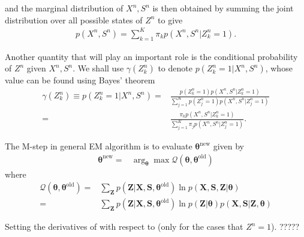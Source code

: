 \documentclass[11pt]{extarticle}
\newcommand{\0}{\mathbf{0}}
\renewcommand{\(}{\left(}
\renewcommand{\)}{\right)}
\theoremstyle{definition}
\begin{document}
and the marginal distribution of $X^{n}, S^{n}$ is then obtained by summing the joint distribution over all possible states of $Z^{n}$ to give
\begin{align*}
	p(X^{n}, S^{n}) = \sum_{k=1}^{K} \pi_{k} p(X^{n}, S^{n} \vert Z^{n}_{k}=1).
\end{align*}
\par Another quantity that will play an important role is the conditional probability of $Z^{n}$ given $X^{n}, S^{n}$. We shall use $\gamma(Z^{n}_{k})$ to denote $p(Z^{n}_{k} = 1 \vert X^{n}, S^{n})$, whose value can be found using Bayes' theorem
\begin{align*}
	\gamma(Z^{n}_{k}) \equiv p(Z^{n}_{k} = 1 \vert X^{n}, S^{n}) =& \frac{p(Z^{n}_{k}=1)p(X^{n}, S^{n} \vert Z^{n}_{k} = 1)}{\sum_{j=1}^{K}p(Z^{n}_{j}=1)p(X^{n}, S^{n} \vert Z^{n}_{j}=1)} \\
	=& \frac{\pi_{k} p(X^{n}, S^{n} \vert Z^{n}_{k} = 1)}{\sum_{j=1}^{K}\pi_{j} p(X^{n}, S^{n} \vert Z^{n}_{j}=1)}.
\end{align*}
\par The M-step in general EM algorithm is to evaluate $\bm{\theta}^{\mathrm{new}}$ given by
\begin{align*}
	\bm{\theta}^{\mathrm{new}} =& \arg_{\bm{\theta}}\max \mathcal{Q}(\bm{\theta}, \bm{\theta}^{\mathrm{old}})
\end{align*}
where
\begin{align*}
	\mathcal{Q}(\bm{\theta}, \bm{\theta}^{\mathrm{old}}) =& \sum_{\mathbf{Z}} p(\mathbf{Z} \vert \mathbf{X}, \mathbf{S}, \bm{\theta}^{\mathrm{old}}) \ln p(\mathbf{X}, \mathbf{S}, \mathbf{Z} \vert \bm{\theta}) \\
	=& \sum_{\mathbf{Z}} p(\mathbf{Z} \vert \mathbf{X}, \mathbf{S}, \bm{\theta}^{\mathrm{old}}) \ln p(\mathbf{Z} \vert \bm{\theta}) p(\mathbf{X}, \mathbf{S} \vert \mathbf{Z}, \bm{\theta})
\end{align*}
\par Setting the derivatives of  with respect to (only for the cases that $Z^{n} = 1$). ?????
\end{document}
